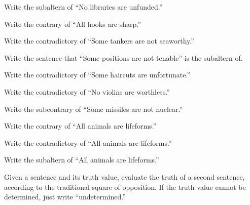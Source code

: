 \begin{exercises}
\item Write the subaltern of ``No libraries are unfunded.''
\item Write the contrary of ``All hooks are sharp.''
\item Write the contradictory of ``Some tankers are not seaworthy.''
\item Write the sentence that ``Some positions are not tenable'' is the subaltern of.
\item Write the contradictory of ``Some haircuts are unfortunate.''
\item Write the contradictory of ``No violins are worthless.''
\item Write the subcontrary of ``Some missiles are not nuclear.''
\item Write the contrary of ``All animals are lifeforms.''
\item Write the contradictory of ``All animals are lifeforms.''
\item Write the subaltern of ``All animals are lifeforms.''
\end{exercises}

\noindent \problempart Given a sentence and its truth value, evaluate the truth of a second sentence, according to the traditional square of opposition. If the truth value cannot be determined, just write ``undetermined.''

